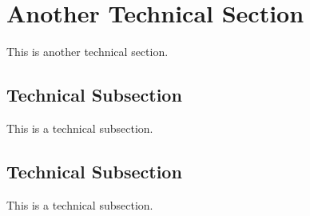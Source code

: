 \section{Another Technical Section}
\label{sec:technical}
% 
This is another technical section.

\subsection{Technical Subsection}
%
This is a technical subsection.

\subsection{Technical Subsection}
%
This is a technical subsection.

